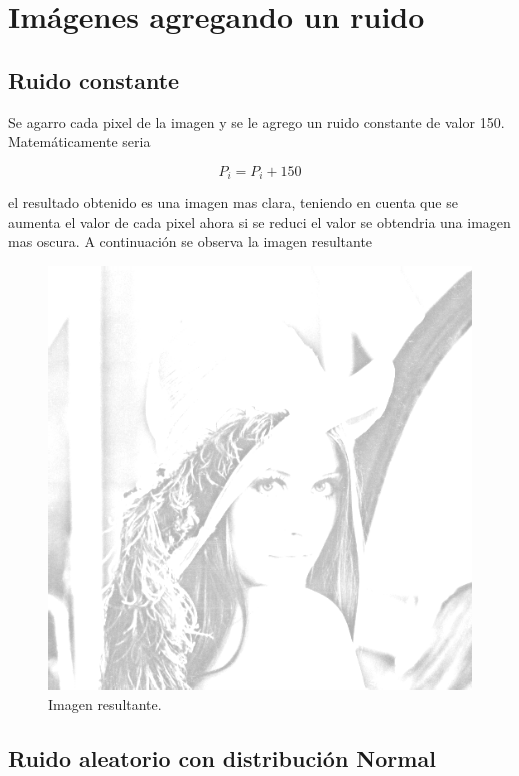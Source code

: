 \section{Imágenes agregando un ruido}

\subsection{Ruido constante}

Se agarro cada pixel de la imagen y se le agrego un ruido constante de valor 150. Matemáticamente seria

\begin{equation}
	P_i = P_i +150
\end{equation}

el resultado obtenido es una imagen mas clara, teniendo en cuenta que se aumenta el valor de cada pixel ahora si se reduci el valor se obtendria una imagen mas oscura. A continuación se observa la imagen resultante

\begin{figure}[H]
	\centering
	\includegraphics[scale=0.5]{imagenes/ruidoCte.png}

	\caption{Imagen resultante.}
\end{figure}	

\subsection{Ruido aleatorio con distribución Normal}

